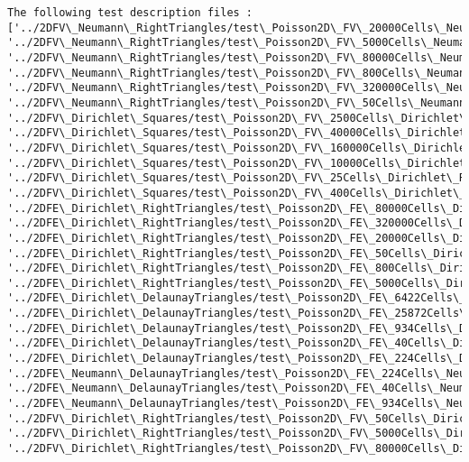 \documentclass[11pt]{article}
\begin{document}
    \begin{Verbatim}[commandchars=\\\{\}]
The following test description files : 
['../2DFV\_Neumann\_RightTriangles/test\_Poisson2D\_FV\_20000Cells\_Neumann\_Regular\_RightTriangles.json', '../2DFV\_Neumann\_RightTriangles/test\_Poisson2D\_FV\_5000Cells\_Neumann\_Regular\_RightTriangles.json', '../2DFV\_Neumann\_RightTriangles/test\_Poisson2D\_FV\_80000Cells\_Neumann\_Regular\_RightTriangles.json', '../2DFV\_Neumann\_RightTriangles/test\_Poisson2D\_FV\_800Cells\_Neumann\_Regular\_RightTriangles.json', '../2DFV\_Neumann\_RightTriangles/test\_Poisson2D\_FV\_320000Cells\_Neumann\_Regular\_RightTriangles.json', '../2DFV\_Neumann\_RightTriangles/test\_Poisson2D\_FV\_50Cells\_Neumann\_Regular\_RightTriangles.json', '../2DFV\_Dirichlet\_Squares/test\_Poisson2D\_FV\_2500Cells\_Dirichlet\_RegularSquares.json', '../2DFV\_Dirichlet\_Squares/test\_Poisson2D\_FV\_40000Cells\_Dirichlet\_RegularSquares.json', '../2DFV\_Dirichlet\_Squares/test\_Poisson2D\_FV\_160000Cells\_Dirichlet\_RegularSquares.json', '../2DFV\_Dirichlet\_Squares/test\_Poisson2D\_FV\_10000Cells\_Dirichlet\_RegularSquares.json', '../2DFV\_Dirichlet\_Squares/test\_Poisson2D\_FV\_25Cells\_Dirichlet\_RegularSquares.json', '../2DFV\_Dirichlet\_Squares/test\_Poisson2D\_FV\_400Cells\_Dirichlet\_RegularSquares.json', '../2DFE\_Dirichlet\_RightTriangles/test\_Poisson2D\_FE\_80000Cells\_Dirichlet\_Regular\_RightTriangles.json', '../2DFE\_Dirichlet\_RightTriangles/test\_Poisson2D\_FE\_320000Cells\_Dirichlet\_Regular\_RightTriangles.json', '../2DFE\_Dirichlet\_RightTriangles/test\_Poisson2D\_FE\_20000Cells\_Dirichlet\_Regular\_RightTriangles.json', '../2DFE\_Dirichlet\_RightTriangles/test\_Poisson2D\_FE\_50Cells\_Dirichlet\_Regular\_RightTriangles.json', '../2DFE\_Dirichlet\_RightTriangles/test\_Poisson2D\_FE\_800Cells\_Dirichlet\_Regular\_RightTriangles.json', '../2DFE\_Dirichlet\_RightTriangles/test\_Poisson2D\_FE\_5000Cells\_Dirichlet\_Regular\_RightTriangles.json', '../2DFE\_Dirichlet\_DelaunayTriangles/test\_Poisson2D\_FE\_6422Cells\_Dirichlet\_Unstructured\_triangles.json', '../2DFE\_Dirichlet\_DelaunayTriangles/test\_Poisson2D\_FE\_25872Cells\_Dirichlet\_Unstructured\_triangles.json', '../2DFE\_Dirichlet\_DelaunayTriangles/test\_Poisson2D\_FE\_934Cells\_Dirichlet\_Unstructured\_triangles.json', '../2DFE\_Dirichlet\_DelaunayTriangles/test\_Poisson2D\_FE\_40Cells\_Dirichlet\_Unstructured\_triangles.json', '../2DFE\_Dirichlet\_DelaunayTriangles/test\_Poisson2D\_FE\_224Cells\_Dirichlet\_Unstructured\_triangles.json', '../2DFE\_Neumann\_DelaunayTriangles/test\_Poisson2D\_FE\_224Cells\_Neumann\_Unstructured\_triangles.json', '../2DFE\_Neumann\_DelaunayTriangles/test\_Poisson2D\_FE\_40Cells\_Neumann\_Unstructured\_triangles.json', '../2DFE\_Neumann\_DelaunayTriangles/test\_Poisson2D\_FE\_934Cells\_Neumann\_Unstructured\_triangles.json', '../2DFV\_Dirichlet\_RightTriangles/test\_Poisson2D\_FV\_50Cells\_Dirichlet\_Regular\_RightTriangles.json', '../2DFV\_Dirichlet\_RightTriangles/test\_Poisson2D\_FV\_5000Cells\_Dirichlet\_Regular\_RightTriangles.json', '../2DFV\_Dirichlet\_RightTriangles/test\_Poisson2D\_FV\_80000Cells\_Dirichlet\_Regular\_RightTriangles.json', 
\end{Verbatim}
\end{document}
